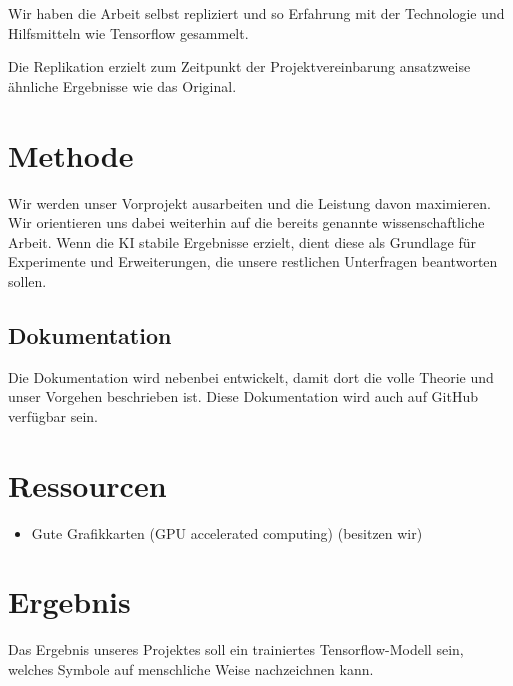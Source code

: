 \documentclass{article}
\begin{document}
Wir haben die Arbeit selbst repliziert und so Erfahrung mit der Technologie und
Hilfsmitteln wie Tensorflow gesammelt.

Die Replikation erzielt zum Zeitpunkt der Projektvereinbarung ansatzweise
ähnliche Ergebnisse wie das Original. 


\section{Methode}
\label{chap:methode}

Wir werden unser Vorprojekt ausarbeiten und die Leistung davon maximieren. Wir
orientieren uns dabei weiterhin auf die bereits genannte wissenschaftliche
Arbeit. Wenn die KI stabile Ergebnisse erzielt, dient diese als Grundlage für
Experimente und Erweiterungen, die unsere restlichen Unterfragen beantworten
sollen. 


\subsection{Dokumentation}
\label{chap:m_dokumentation}
Die Dokumentation wird nebenbei entwickelt, damit dort die volle Theorie
und unser Vorgehen beschrieben ist. Diese Dokumentation wird auch auf GitHub
verfügbar sein. 


\section{Ressourcen}
\label{chap:ressourcen}

\begin{itemize}
    \item Gute Grafikkarten (GPU accelerated computing) (besitzen wir)
\end{itemize}


\section{Ergebnis}
\label{chap:ergebnis}
Das Ergebnis unseres Projektes soll ein trainiertes Tensorflow-Modell sein,
welches Symbole auf menschliche Weise nachzeichnen kann.
\end{document}
